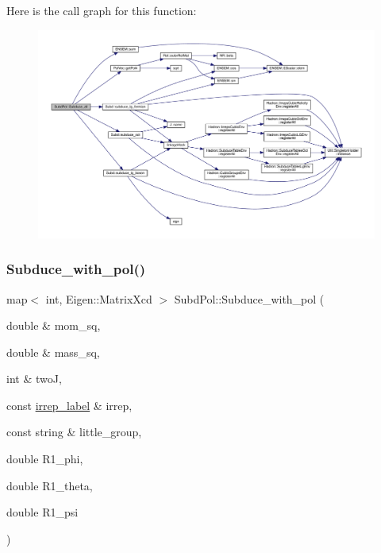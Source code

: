 Here is the call graph for this function\+:
\nopagebreak
\begin{figure}[H]
\begin{center}
\leavevmode
\includegraphics[width=350pt]{db/d8a/namespaceSubdPol_a5ddb170891621f66c6e8b9a0e51dd362_cgraph}
\end{center}
\end{figure}
\mbox{\label{namespaceSubdPol_ad6ba4f4261604a40b788b2922ed2871e}} 
\subsubsection{\texorpdfstring{Subduce\_with\_pol()}{Subduce\_with\_pol()}}
{\footnotesize\ttfamily map$<$ int, Eigen\+::\+Matrix\+Xcd $>$ Subd\+Pol\+::\+Subduce\+\_\+with\+\_\+pol (\begin{DoxyParamCaption}\item[{double \&}]{mom\+\_\+sq,  }\item[{double \&}]{mass\+\_\+sq,  }\item[{int \&}]{twoJ,  }\item[{const \mbox{\hyperlink{structirrep__label}{irrep\+\_\+label}} \&}]{irrep,  }\item[{const string \&}]{little\+\_\+group,  }\item[{double}]{R1\+\_\+phi,  }\item[{double}]{R1\+\_\+theta,  }\item[{double}]{R1\+\_\+psi }\end{DoxyParamCaption})}

